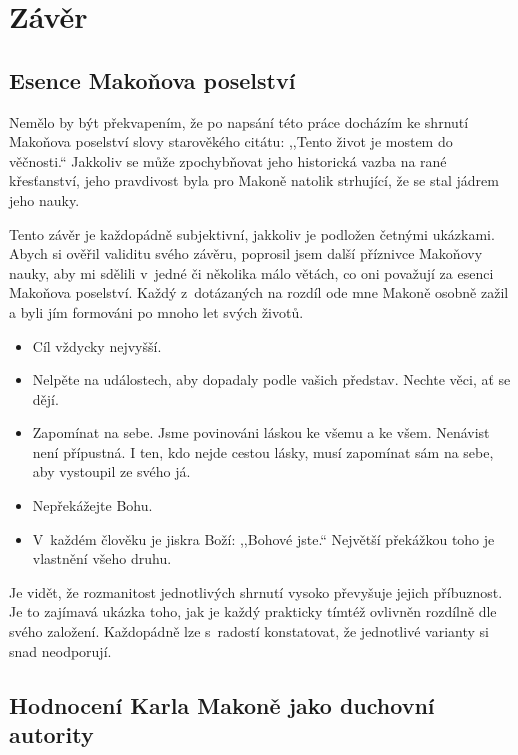 \chapter{Závěr}

\section{Esence Makoňova poselství}

Nemělo by být překvapením, že po napsání této práce docházím ke shrnutí Makoňova
poselství slovy starověkého citátu: ,,Tento život je mostem do věčnosti.``
Jakkoliv se může zpochybňovat jeho historická vazba na rané
křesťanství\cite{dus2001neznama}, jeho pravdivost byla pro Makoně natolik
strhující, že se stal jádrem jeho nauky.

Tento závěr je každopádně subjektivní, jakkoliv je podložen četnými ukázkami.
Abych si ověřil validitu svého závěru, poprosil jsem další příznivce Makoňovy
nauky, aby mi sdělili v~jedné či několika málo větách, co oni považují za esenci
Makoňova poselství. Každý z~dotázaných na rozdíl ode mne Makoně osobně zažil a
byli jím formováni po mnoho let svých životů.

\begin{itemize}
\item{Cíl vždycky nejvyšší.}
\item{Nelpěte na událostech, aby dopadaly podle vašich představ. Nechte věci, ať
  se dějí.}
\item{Zapomínat na sebe. Jsme povinováni láskou ke všemu a ke všem. Nenávist
  není přípustná. I ten, kdo nejde cestou lásky, musí zapomínat sám na sebe, aby
    vystoupil ze svého já.}
\item{Nepřekážejte Bohu.}
\item{V~každém člověku je jiskra Boží: ,,Bohové jste.`` Největší překážkou toho
  je vlastnění všeho druhu.}
\end{itemize}

Je vidět, že rozmanitost jednotlivých shrnutí vysoko převyšuje jejich
příbuznost. Je to zajímavá ukázka toho, jak je každý prakticky tímtéž ovlivněn
rozdílně dle svého založení. Každopádně lze s~radostí konstatovat, že jednotlivé
varianty si snad neodporují.

\section{Hodnocení Karla Makoně jako duchovní autority}

